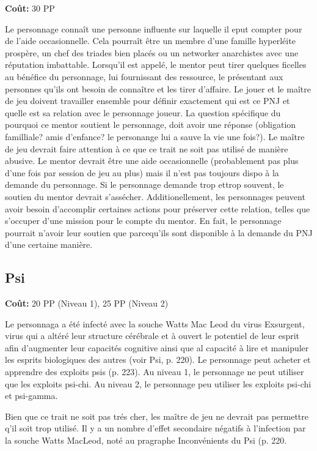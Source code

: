 \textbf{Coût:} 30 PP 

Le personnage connaît une personne influente sur laquelle il eput compter pour de l'aide occasionnelle. Cela pourraît être un membre d'une famille hyperléite prospère, un chef des triades bien placés ou un networker anarchistes avec une réputation imbattable. Lorsqu'il est appelé, le mentor peut tirer quelques ficelles au bénéfice du personnage, lui fournissant des ressource, le présentant aux personnes qu'ils ont besoin de connaître et les tirer d'affaire. Le jouer et le maître de jeu doivent travailler ensemble pour définir exactement qui est ce PNJ et quelle est sa relation avec le personnage joueur. La question spécifique du pourquoi ce mentor soutient le personnage, doit avoir une réponse (obligation familliale? amis d'enfance? le personange lui a sauve la vie une fois?). Le maître de jeu devrait faire attention à ce que ce trait ne soit pas utilisé de manière abusive. Le mentor devrait être une aide occasionnelle (probablement pas plus d'une fois par session de jeu au plus) mais il n'est pas toujours dispo à la demande du personnage. Si le personnage demande trop ettrop souvent, le soutien du mentor devrait s'assécher. Additionellement, les personnages peuvent avoir besoin d'accomplir certaines actions pour préserver cette relation, telles que s'occuper d'une mission pour le compte du mentor. En fait, le personnage pourrait n'avoir leur soutien que parcequ'ils sont disponible à la demande du PNJ d'une certaine manière. 

\subsection{Psi} \label{sec:traits-psi} \textbf{Coût:} 20 PP (Niveau 1), 25 PP (Niveau 2) 

Le personnaga a été infecté avec la souche Watts Mac Leod du virus Exsurgent, virus qui a altéré leur structure cérébrale et à ouvert le potentiel de leur esprit afin d'augmenter leur capacités cognitive ainsi que al capacité à lire et manipuler les esprits biologiques des autres (voir Psi, p. 220). Le personnage peut acheter et apprendre des exploits psis (p. 223). Au niveau 1, le personnage ne peut utiliser que les exploits psi-chi. Au niveau 2, le personnage peu utiliser les exploits psi-chi et psi-gamma. 

Bien que ce trait ne soit pas trés cher, les maître de jeu ne devrait pas permettre q'il soit trop utilisé. Il y a un nombre d'effet secondaire négatifs à l'infection par la souche Watts MacLeod, noté au pragraphe Inconvénients du Psi (p. 220. 

